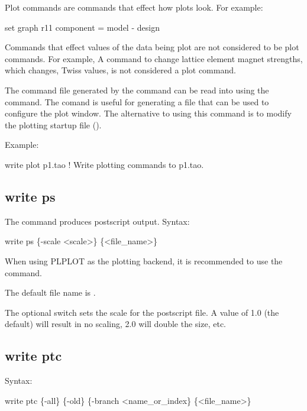 {{{{{{{{{{{{Plot commands are commands that effect how plots look. For example:
\begin{example}
  set graph r11 component = model - design
\end{example}
Commands that effect values of the data being plot are not considered to be plot commands. For
example, A command to change lattice element magnet strengths, which changes, Twiss values, is
not considered a plot command.

The command file generated by the  command can be read into \tao using the
 command. The  comand is useful for generating a file that
can be used to configure the plot window. The alternative to using this command is to modify
the plotting startup file ().

Example:
\begin{example}
  write plot p1.tao   ! Write plotting commands to p1.tao.
\end{example}


\subsection{write ps}
\label{s:write.ps}

The  command produces postscript output. Syntax:
\begin{example}
  write ps \{-scale <scale>\} \{<file_name>\}
\end{example}
When using PLPLOT as the plotting backend, it is recommended to use the  command.

The default file name is . 

The optional  switch sets the scale for the postscript file. A value of 1.0 (the
default) will result in no scaling, 2.0 will double the size, etc.


\subsection{write ptc}
\label{s:write.ptc}

Syntax:
\begin{example}
  write ptc \{-all\} \{-old\} \{-branch <name_or_index\} \{<file_name>\}
\end{example}

}}}}}}}}}}}}
